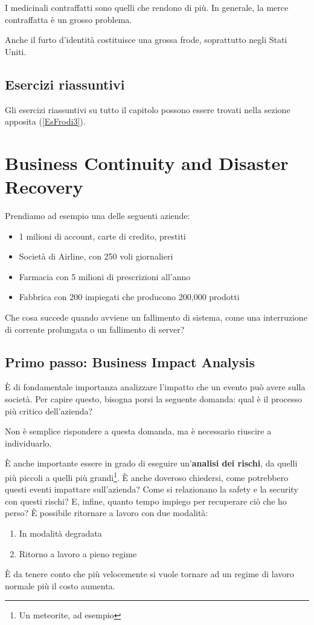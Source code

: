 I medicinali contraffatti sono quelli che rendono di più. In generale, la merce
contraffatta è un grosso problema.

Anche il furto d'identità costituisce una grossa frode, soprattutto negli
Stati Uniti.

\section{Esercizi riassuntivi}

Gli esercizi riassuntivi su tutto il capitolo possono essere trovati nella
sezione apposita (\ref{EsFrodi3}).

\chapter{Business Continuity and Disaster Recovery}
\label{BCDR}

Prendiamo ad esempio una delle seguenti aziende:
\begin{itemize}
  \item 1 milioni di account, carte di credito, prestiti
  \item Società di Airline, con 250 voli giornalieri
  \item Farmacia con 5 milioni di prescrizioni all'anno
  \item Fabbrica con 200 impiegati che producono 200,000 prodotti
\end{itemize}

Che cosa succede quando avviene un fallimento di sistema, come una interruzione
di corrente prolungata o un fallimento di server?

\section{Primo passo: Business Impact Analysis}

È di fondamentale importanza analizzare l'impatto che un evento può avere sulla
società. Per capire questo, bisogna porsi la seguente domanda: qual è il
processo più critico dell'azienda?

Non è semplice rispondere a questa domanda, ma è necessario riuscire a
individuarlo.

È anche importante essere in grado di eseguire un'\textbf{analisi dei rischi},
da quelli più piccoli a quelli più grandi\footnote{Un meteorite, ad esempio}. È
anche doveroso chiedersi, come potrebbero questi eventi impattare sull'azienda?
Come si relazionano la safety e la security con questi rischi? E, infine,
quanto tempo impiego per recuperare ciò che ho perso? È possibile ritornare a
lavoro con due modalità:
\begin{enumerate}
  \item In modalità degradata
  \item Ritorno a lavoro a pieno regime
\end{enumerate}

È da tenere conto che più velocemente si vuole tornare ad un regime di lavoro
normale più il costo aumenta.
